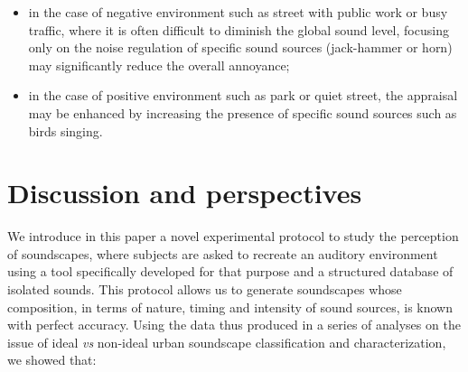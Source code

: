 \documentclass[twoside,twocolumn]{article}
\begin{document}
\begin{itemize}
\item in the case of negative environment such as street with public work or busy traffic, where it is often difficult to diminish the global sound level, focusing only on the noise regulation of specific sound sources (jack-hammer or horn) may significantly reduce the overall annoyance;
\item in the case of positive environment such as park or quiet street, the appraisal may be enhanced by increasing the presence of specific sound sources such as birds singing.
\end{itemize}

 

\section{Discussion and perspectives}


We introduce in this paper a novel experimental protocol to study the perception of soundscapes, where subjects are asked to recreate an auditory environment using a tool specifically developed for that purpose and a structured database of isolated sounds. This protocol allows us to generate soundscapes whose composition, in terms of nature, timing and intensity of sound sources, is known with perfect accuracy. Using the data thus produced in a series of analyses on the issue of ideal \emph{vs} non-ideal urban soundscape classification and characterization, we showed that:
\end{document}
